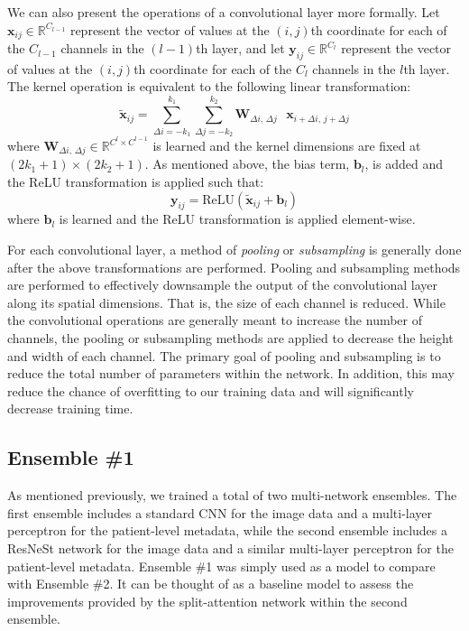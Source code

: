 \documentclass [MAS] {uclathes}
\begin{document}
We can also present the operations of a convolutional layer more formally. Let $\mathbf{x}_{i j} \in \mathbb{R}^{C_{l-1}}$ represent the vector of values at the $(i, j)$th coordinate for each of the $C_{l-1}$ channels in the $(l-1)$th layer, and let $\mathbf{y}_{i j} \in \mathbb{R}^{C_{l}}$ represent the vector of values at the $(i, j)$th coordinate for each of the $C_{l}$ channels in the $l$th layer. The kernel operation is equivalent to the following linear transformation: $$\tilde{\mathbf{x}}_{i j} = \sum_{\Delta i = -k_1}^{k_1} \sum_{\Delta j = -k_2}^{k_2} \mathbf{W}_{\Delta i \text{, } \Delta j} \text{ } \mathbf{x}_{i+\Delta i \text{, } j+\Delta j}$$ where $\mathbf{W}_{\Delta i \text{, } \Delta j} \in \mathbb{R}^{C^{l} \times C^{l-1}}$ is learned and the kernel dimensions are fixed at $(2k_1 + 1) \times (2k_2+1)$. As mentioned above, the bias term, $\mathbf{b}_{l}$, is added and the ReLU transformation is applied such that: $$\mathbf{y}_{i j} = \text{ReLU}(\tilde{\mathbf{x}}_{i j} + \mathbf{b}_{l})$$ where $\mathbf{b}_{l}$ is learned and the ReLU transformation is applied element-wise.

For each convolutional layer, a method of \textit{pooling} or \textit{subsampling} is generally done after the above transformations are performed. Pooling and subsampling methods are performed to effectively downsample the output of the convolutional layer along its spatial dimensions. That is, the size of each channel is reduced. While the convolutional operations are generally meant to increase the number of channels, the pooling or subsampling methods are applied to decrease the height and width of each channel. The primary goal of pooling and subsampling is to reduce the total number of parameters within the network. In addition, this may reduce the chance of overfitting to our training data and will significantly decrease training time.

\subsection{Ensemble \#1}

As mentioned previously, we trained a total of two multi-network ensembles. The first ensemble includes a standard CNN for the image data and a multi-layer perceptron for the patient-level metadata, while the second ensemble includes a ResNeSt network for the image data and a similar multi-layer perceptron for the patient-level metadata. Ensemble \#1 was simply used as a model to compare with Ensemble \#2. It can be thought of as a baseline model to assess the improvements provided by the split-attention network within the second ensemble. 
\end{document}
